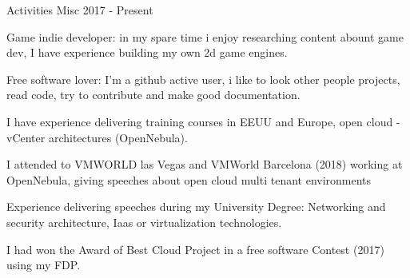 \begin{cventries}
  \cventry
    {Activities} %
    {Misc}
    {}
    {2017 - Present}
    {
      \begin{cvitems} %
        \item{Game indie developer: in my spare time i enjoy researching content abount game dev, I have experience building my own 2d game engines.}
        \item{Free software lover: I'm a github active user, i like to look other people projects, read code, try to contribute and make good documentation.}
        \item{I have experience delivering training courses in EEUU and Europe, open cloud - vCenter architectures (OpenNebula).}
        \item{I attended to VMWORLD las Vegas and VMWorld Barcelona (2018) working at OpenNebula, giving speeches about open cloud multi tenant environments}
        \item{Experience delivering speeches during my University Degree: Networking and security architecture, Iaas or virtualization technologies.}
        \item{I had won the Award of Best Cloud Project in a free software Contest (2017) using  my FDP.}
      \end{cvitems}
    }

\end{cventries}
